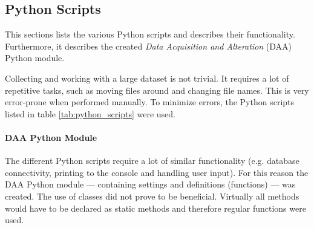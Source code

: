 \subsection{Python Scripts}
\label{subsec:python_scripts}

This sections lists the various Python scripts and describes their functionality.
Furthermore, it describes the created \textit{Data Acquisition and Alteration} (DAA) Python module.

Collecting and working with a large dataset is not trivial.
It requires a lot of repetitive tasks, such as moving files around and changing file names.
This is very error-prone when performed manually.
To minimize errors, the Python scripts listed in table \ref{tab:python_scripts} were used.
\\

\paragraph{DAA Python Module}
The different Python scripts require a lot of similar functionality (e.g. database connectivity, printing to the console and handling user input).
For this reason the DAA Python module --- containing settings and definitions (functions) --- was created.
The use of classes did not prove to be beneficial.
Virtually all methods would have to be declared as static methods and therefore regular functions were used.

